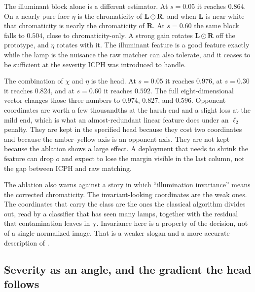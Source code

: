 The illuminant block alone is a different estimator. At $s=0.05$ it reaches $0.864$. On a nearly pure face $\eta$ is the chromaticity of $\mathbf{L}\odot\mathbf{R}$, and when $\mathbf{L}$ is near white that chromaticity is nearly the chromaticity of $\mathbf{R}$. At $s=0.60$ the same block falls to $0.504$, close to chromaticity-only. A strong gain rotates $\mathbf{L}\odot\mathbf{R}$ off the prototype, and $\eta$ rotates with it. The illuminant feature is a good feature exactly while the lamp is the nuisance the raw matcher can also tolerate, and it ceases to be sufficient at the severity ICPH was introduced to handle.

The combination of $\chi$ and $\eta$ is the head. At $s=0.05$ it reaches $0.976$, at $s=0.30$ it reaches $0.824$, and at $s=0.60$ it reaches $0.592$. The full eight-dimensional vector changes those three numbers to $0.974$, $0.827$, and $0.596$. Opponent coordinates are worth a few thousandths at the harsh end and a slight loss at the mild end, which is what an almost-redundant linear feature does under an $\ell_2$ penalty. They are kept in the specified head because they cost two coordinates and because the amber--yellow axis is an opponent axis. They are not kept because the ablation shows a large effect. A deployment that needs to shrink the feature can drop $o$ and expect to lose the margin visible in the last column, not the gap between ICPH and raw matching.

The ablation also warns against a story in which ``illumination invariance'' means the corrected chromaticity. The invariant-looking coordinates are the weak ones. The coordinates that carry the class are the ones the classical algorithm divides out, read by a classifier that has seen many lamps, together with the residual that contamination leaves in $\chi$. Invariance here is a property of the decision, not of a single normalized image. That is a weaker slogan and a more accurate description of .

\subsection{Severity as an angle, and the gradient the head follows}
\label{sec:icph-angle}

